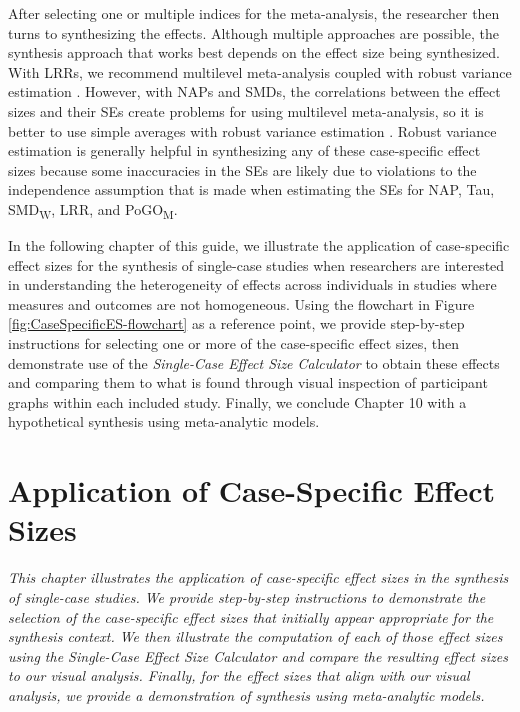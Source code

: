 \documentclass[
]{book}
\begin{document}
After selecting one or multiple indices for the meta-analysis, the researcher then turns to synthesizing the effects. Although multiple approaches are possible, the synthesis approach that works best depends on the effect size being synthesized. With LRRs, we recommend multilevel meta-analysis coupled with robust variance estimation \citep{Chen_Pustejovsky_2022}. However, with NAPs and SMDs, the correlations between the effect sizes and their SEs create problems for using multilevel meta-analysis, so it is better to use simple averages with robust variance estimation \citep{Chen_Pustejovsky_2022}. Robust variance estimation is generally helpful in synthesizing any of these case-specific effect sizes because some inaccuracies in the SEs are likely due to violations to the independence assumption that is made when estimating the SEs for NAP, Tau, SMD\textsubscript{W}, LRR, and PoGO\textsubscript{M}.

In the following chapter of this guide, we illustrate the application of case-specific effect sizes for the synthesis of single-case studies when researchers are interested in understanding the heterogeneity of effects across individuals in studies where measures and outcomes are not homogeneous. Using the flowchart in Figure \ref{fig:CaseSpecificES-flowchart} as a reference point, we provide step-by-step instructions for selecting one or more of the case-specific effect sizes, then demonstrate use of the \emph{Single-Case Effect Size Calculator} \citep{pustejovsky2023SingleCaseES} to obtain these effects and comparing them to what is found through visual inspection of participant graphs within each included study. Finally, we conclude Chapter 10 with a hypothetical synthesis using meta-analytic models.

\hypertarget{app-case-specific-es}{%
\chapter{Application of Case-Specific Effect Sizes}\label{app-case-specific-es}}

\emph{This chapter illustrates the application of case-specific effect sizes in the synthesis of single-case studies. We provide step-by-step instructions to demonstrate the selection of the case-specific effect sizes that initially appear appropriate for the synthesis context. We then illustrate the computation of each of those effect sizes using the Single-Case Effect Size Calculator and compare the resulting effect sizes to our visual analysis. Finally, for the effect sizes that align with our visual analysis, we provide a demonstration of synthesis using meta-analytic models.}
\end{document}
